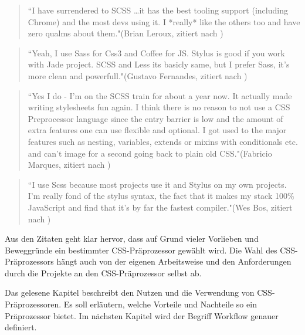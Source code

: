 \begin{quote}
``I have surrendered to SCSS …it has the best tooling support (including Chrome) and the most devs using it. I *really* like the others too and have zero qualms about them."(Brian Leroux, zitiert nach \cite[]{psdtowp.2014})
\end{quote} 
\begin{quote}
``Yeah, I use Sass for Css3 and Coffee for JS. Stylus is good if you work with Jade project. SCSS and Less its basicly same, but I prefer Sass, it's more clean and powerfull."(Gustavo Fernandes, zitiert nach \cite[]{psdtowp.2014})
\end{quote} 
\begin{quote}
``Yes I do - I’m on the SCSS train for about a year now. It actually made writing stylesheets fun again. I think there is no reason to not use a CSS Preprocessor language since the entry barrier is low and the amount of extra features one can use flexible and optional. I got used to the major features such as nesting, variables, extends or mixins with conditionals etc. and can’t image for a second going back to plain old CSS."(Fabricio Marques, zitiert nach \cite[]{psdtowp.2014})
\end{quote} 
\begin{quote}
``I use Scss because most projects use it and Stylus on my own projects. I'm really fond of the stylus syntax, the fact that it makes my stack 100\% JavaScript and find that it's by far the fastest compiler."(Wes Bos, zitiert nach \cite[]{psdtowp.2014})
\end{quote} 
Aus den Zitaten geht klar hervor, dass auf Grund vieler Vorlieben und Beweggründe ein bestimmter CSS-Präprozessor gewählt wird. \newline
Die Wahl des CSS-Präprozessors hängt auch von der eigenen Arbeitsweise und den Anforderungen durch die Projekte an den CSS-Präprozessor selbst ab.\newline

Das gelesene Kapitel beschreibt den Nutzen und die Verwendung von CSS-Präprozessoren. Es soll erläutern, welche Vorteile und Nachteile so ein Präprozessor bietet. Im nächsten Kapitel wird der Begriff Workflow genauer definiert.
